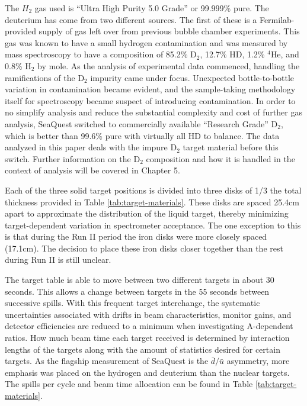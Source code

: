 The $H_2$ gas used is ``Ultra High Purity 5.0 Grade'' or 99.999\% pure.  The deuterium has come from two different sources.  The first of these is a Fermilab-provided supply of gas left over from previous bubble chamber experiments. This gas was known to have a small hydrogen contamination and was measured by mass spectroscopy to have a composition of 85.2\% D$_2$, 12.7\% HD, 1.2\% $^4$He, and 0.8\% H$_2$ by mole. As the analysis of experimental data commenced, handling the ramifications of the D$_2$ impurity came under focus. Unexpected bottle-to-bottle variation in contamination became evident, and the sample-taking methodology itself for spectroscopy became suspect of introducing contamination. In order to no simplify analysis and reduce the substantial complexity and cost of further gas analysis, SeaQuest switched to commercially available ``Research Grade'' D$_2$, which is better than 99.6\% pure with virtually all HD to balance. The data analyzed in this paper deals with the impure D$_2$ target material before this switch. Further information on the D$_2$ composition and how it is handled in the context of analysis will be covered in Chapter 5.

Each of the three solid target positions is divided into three disks of 1/3 the total thickness provided in Table \ref{tab:target-materials}. These disks are spaced 25.4cm apart to approximate the distribution of the liquid target, thereby minimizing target-dependent variation in spectrometer acceptance. The one exception to this is that during the Run II period the iron disks were more closely spaced (17.1cm). The decision to place these iron disks closer together than the rest during Run II is still unclear.

The target table is able to move between two different targets in about 30 seconds. This allows a change between targets in the 55 seconds between successive spills. With this frequent target interchange, the systematic uncertainties associated with drifts in beam characteristics, monitor gains, and detector efficiencies are reduced to a minimum when investigating A-dependent ratios. How much beam time each target received is determined by interaction lengths of the targets along with the amount of statistics desired for certain targets. As the flagship measurement of SeaQuest is the $\bar{d}/\bar{u}$ asymmetry, more emphasis was placed on the hydrogen and deuterium than the nuclear targets. The spills per cycle and beam time allocation can be found in Table \ref{tab:target-materials}.

